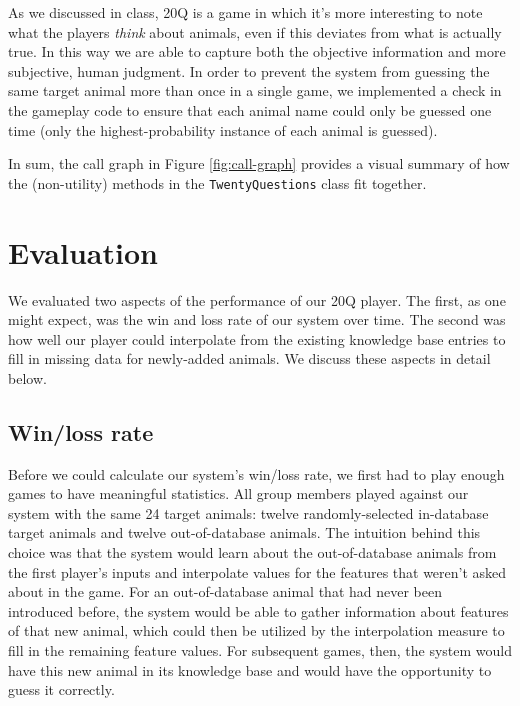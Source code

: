 \documentclass[11pt,a4paper]{article}
\begin{document}
As we discussed in class, 20Q is a game in which it's more interesting to note what the players \textit{think} about animals, even if this deviates from what is actually true. 
In this way we are able to capture both the objective information and more subjective, human judgment. 
In order to prevent the system from guessing the same target animal more than once in a single game, we implemented a check in the gameplay code to ensure that each animal name could only be guessed one time (only the highest-probability instance of each animal is guessed).  

\pagebreak

\noindent In sum, the call graph in Figure \ref{fig:call-graph} provides a visual summary of how the (non-utility) methods in the \texttt{TwentyQuestions} class fit together.

\section{Evaluation}
\label{sec:eval}

We evaluated two aspects of the performance of our 20Q player. 
The first, as one might expect, was the win and loss rate of our system over time. 
The second was how well our player could interpolate from the existing knowledge base entries to fill in missing data for newly-added animals.
We discuss these aspects in detail below.

\subsection{Win/loss rate}
\label{subsec:eval-win-loss}

Before we could calculate our system's win/loss rate, we first had to play enough games to have meaningful statistics. 
All group members played against our system with the same 24 target animals: twelve randomly-selected in-database target animals and twelve out-of-database animals. 
The intuition behind this choice was that the system would learn about the out-of-database animals from the first player's inputs and interpolate values for the features that weren't asked about in the game. 
For an out-of-database animal that had never been introduced before, the system would be able to gather information about features of that new animal, which could then be utilized by the interpolation measure to fill in the remaining feature values. 
For subsequent games, then, the system would have this new animal in its knowledge base and would have the opportunity to guess it correctly. 
\end{document}
